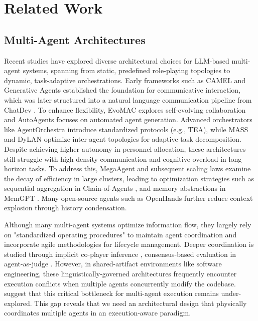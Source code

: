 \section{Related Work}
\subsection{Multi-Agent Architectures}
Recent studies have explored diverse architectural choices for LLM-based multi-agent systems, spanning from static, predefined role-playing topologies to dynamic, task-adaptive orchestrations. Early frameworks such as CAMEL \citep{li2023camel} and Generative Agents \citep{park2023generative} established the foundation for communicative interaction, which was later structured into a natural language communication pipeline from ChatDev \citep{qian2024chatdev}. To enhance flexibility, EvoMAC \cite{hu2024self} 
explores self-evolving collaboration and AutoAgents \cite{chen2023autoagents} focuses on automated agent generation. Advanced orchestrators like AgentOrchestra \cite{zhang2025agentorchestra} introduce standardized protocols (e.g., TEA), while MASS \citep{zhou2025multi} and DyLAN \citep{liu2023dynamic} optimize inter-agent topologies for adaptive task decomposition. Despite achieving higher autonomy in personnel allocation, these architectures still struggle with high-density communication and cognitive overload in long-horizon tasks. To address this, MegaAgent \cite{wang2025megaagent} and subsequent scaling laws \citep{qian2024scaling} examine the decay of efficiency in large clusters, leading to optimization strategies such as sequential aggregation in Chain-of-Agents \citep{zhang2024chain}, and memory abstractions in MemGPT \citep{packer2023memgpt}. Many open-source agents such as OpenHands \citep{wang2024openhands} further reduce context explosion through history condensation.

Although many multi-agent systems optimize information flow, they largely rely on "standardized operating procedures" to maintain agent coordination \citep{hong2023metagpt, nguyen2025agilecoder} and incorporate agile methodologies for lifecycle management. Deeper coordination is studied through implicit co-player inference \citep{meulemans2024multi}, consensus-based evaluation in agent-as-judge \citep{zhuge2024agent}. However, in shared-artifact environments like software engineering, these linguistically-governed architectures frequently encounter execution conflicts when multiple agents concurrently modify the codebase. \cite{khatua2026cooperbench} suggest that this critical bottleneck for multi-agent execution remains under-explored. This gap reveals that we need an architectural design that physically coordinates multiple agents in an execution-aware paradigm.


